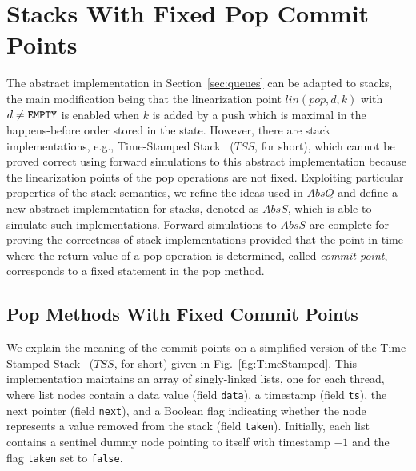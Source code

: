 \vspace{-1mm}
\section{Stacks With Fixed Pop Commit Points}\label{sec:stacks}
The abstract implementation in Section~\ref{sec:queues} can be adapted to stacks, the main modification being that the linearization point $lin(pop,d,k)$ with $d\neq{\tt EMPTY}$ is enabled when $k$ is added by a push which is maximal in the happens-before order stored in the state. However, there are stack implementations, e.g., Time-Stamped Stack~\cite{DBLP:conf/popl/DoddsHK15} ($\mathit{TSS}$, for short), which cannot be proved correct using forward simulations to this abstract implementation because the linearization points of the pop operations are not fixed.
Exploiting particular properties of the stack semantics, we refine the ideas used in $AbsQ$ and define
a new abstract implementation for stacks, denoted as $AbsS$, which is able to simulate such implementations. Forward simulations to $AbsS$ are complete for proving the correctness of stack implementations provided that the point in time where the return value of a pop operation is determined, called \emph{commit point}, corresponds to a fixed statement in the pop method.

\vspace{-2.5mm}
\subsection{Pop Methods With Fixed Commit Points}

We explain the meaning of the commit points on a simplified version of the Time-Stamped Stack~\cite{DBLP:conf/popl/DoddsHK15} ($\mathit{TSS}$, for short) given in Fig.~\ref{fig:TimeStamped}. This  implementation maintains an array of singly-linked lists, one for each thread, where list nodes contain a data value (field {\tt data}), a timestamp (field {\tt ts}), the next pointer (field {\tt next}), and a Boolean flag indicating whether the node represents a value removed from the stack (field {\tt taken}). Initially, each list contains a sentinel dummy node pointing to itself with timestamp $-1$ and the flag {\tt taken} set to {\tt false}.


